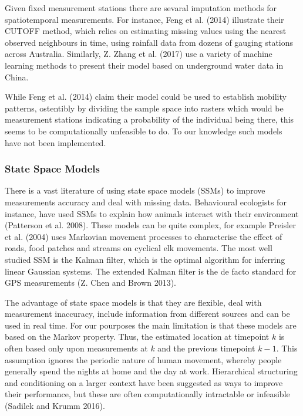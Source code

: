\documentclass[]{article}
\begin{document}
Given fixed measurement stations there are sevaral imputation methods
for spatiotemporal measurements. For instance, Feng et al. (2014)
illustrate their CUTOFF method, which relies on estimating missing
values using the nearest observed neighbours in time, using rainfall
data from dozens of gauging stations across Australia. Similarly, Z.
Zhang et al. (2017) use a variety of machine learning methods to present
their model based on underground water data in China.

While Feng et al. (2014) claim their model could be used to establish
mobility patterns, ostentibly by dividing the sample space into rasters
which would be measurement stations indicating a probability of the
individual being there, this seems to be computationally unfeasible to
do. To our knowledge such models have not been implemented.

\subsubsection{State Space Models}\label{state-space-models}

There is a vast literature of using state space models (SSMs) to improve
measurements accuracy and deal with missing data. Behavioural ecologists
for instance, have used SSMs to explain how animals interact with their
environment (Patterson et al. 2008). These models can be quite complex,
for example Preisler et al. (2004) uses Markovian movement processes to
characterise the effect of roads, food patches and streams on cyclical
elk movements. The most well studied SSM is the Kalman filter, which is
the optimal algorithm for inferring linear Gaussian systems. The
extended Kalman filter is the de facto standard for GPS measurements (Z.
Chen and Brown 2013).

The advantage of state space models is that they are flexible, deal with
measurement inaccuracy, include information from different sources and
can be used in real time. For our pourposes the main limitation is that
these models are based on the Markov property. Thus, the estimated
location at timepoint \(k\) is often based only upon measurements at
\(k\) and the previous timepoint \(k-1\). This assumption ignores the
periodic nature of human movement, whereby people generally spend the
nights at home and the day at work. Hierarchical structuring and
conditioning on a larger context have been suggested as ways to improve
their performance, but these are often computationally intractable or
infeasible (Sadilek and Krumm 2016).
\end{document}
